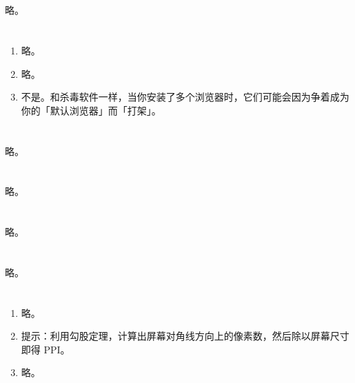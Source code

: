 \section{}

略。

\section{}

\begin{enumerate}
  \item 略。
  \item 略。
  \item 不是。和杀毒软件一样，当你安装了多个浏览器时，它们可能会因为争着成为你的「默认浏览器」而「打架」。
\end{enumerate}

\section{}

略。

\section{}

略。

\section{}

略。

\section{}

略。

\section{}

\begin{enumerate}
  \item 略。
  \item 提示：利用勾股定理，计算出屏幕对角线方向上的像素数，然后除以屏幕尺寸即得 PPI。
  \item 略。
\end{enumerate}

